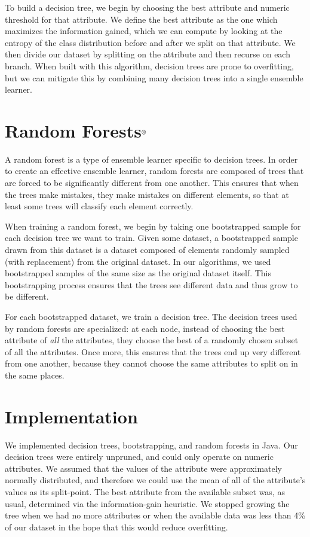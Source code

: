 \documentclass[11pt, twocolumn]{article}
\begin{document}
To build a decision tree, we begin by choosing the best attribute and numeric threshold for that
attribute. We define the best attribute as the one which maximizes the information gained, which we
can compute by looking at the entropy of the class distribution before and after we split on that
attribute. We then divide our dataset by splitting on the attribute and then recurse on each branch.
When built with this algorithm, decision trees are prone to overfitting, but we can mitigate this by
combining many decision trees into a single ensemble learner.

\section*{Random Forests$^\text{\textregistered}$}
A random forest is a type of ensemble learner specific to decision trees. In order to create an
effective ensemble learner, random forests are composed of trees that are forced to be significantly
different from one another. This ensures that when the trees make mistakes, they make mistakes on
different elements, so that at least some trees will classify each element correctly.

When training a random forest, we begin by taking one bootstrapped sample for each decision tree we
want to train. Given some dataset, a bootstrapped sample drawn from this dataset is a dataset
composed of elements randomly sampled (with replacement) from the original dataset. In our
algorithms, we used bootstrapped samples of the same size as the original dataset itself. This
bootstrapping process ensures that the trees see different data and thus grow to be different.

For each bootstrapped dataset, we train a decision tree. The decision trees used by random forests
are specialized: at each node, instead of choosing the best attribute of \emph{all} the attributes,
they choose the best of a randomly chosen subset of all the attributes. Once more, this ensures that
the trees end up very different from one another, because they cannot choose the same attributes to
split on in the same places.

\section*{Implementation}
We implemented decision trees, bootstrapping, and random forests in Java. Our decision trees were
entirely unpruned, and could only operate on numeric attributes. We assumed that the values of the
attribute were approximately normally distributed, and therefore we could use the mean of all of the
attribute's values as its split-point. The best attribute from the available subset was, as usual,
determined via the information-gain heuristic. We stopped growing the tree when we had no more
attributes or when the available data was less than 4\% of our dataset in the hope that this would
reduce overfitting.
\end{document}
